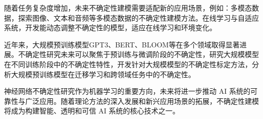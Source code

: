 随着任务复杂度增加，未来不确定性建模需要适配新的应用场景，例如：多模态数据，探索图像、文本和音频等多模态数据的不确定性建模方法。在线学习与自适应系统，开发能动态调整不确定性的模型，适应在线学习和环境变化。

近年来，大规模预训练模型GPT3\cite{brown2020language}、BERT\cite{devlin2019bert}、BLOOM\cite{scao2022bloom}等在多个领域取得显著进展。不确定性研究未来可以聚焦于预训练与微调阶段的不确定性，研究大规模模型在不同训练阶段中的不确定性特性，开发针对大规模模型的不确定性标定方法，分析大规模预训练模型在迁移学习和跨领域任务中的不确定性。

神经网络不确定性研究作为机器学习的重要方向，未来将进一步推动 AI 系统的可靠性与广泛应用。随着理论方法的深入发展和新兴应用场景的拓展，不确定性建模将成为构建智能、透明和可信 AI 系统的核心技术之一。



